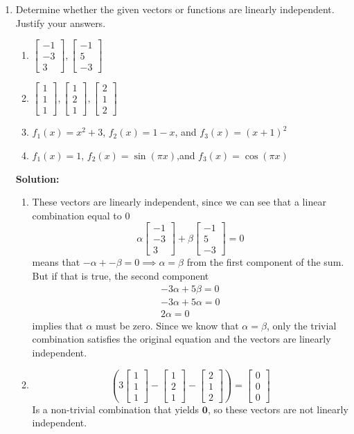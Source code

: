 \documentclass[]{article}
\newcommand{\bbm}{\begin{bmatrix}}		%
\newcommand{\ebm}{\end{bmatrix}}		%
\newcommand{\solution}{\vskip 0.5cm \textbf{\large Solution:} \\}
\begin{document}
    \begin{enumerate}[resume]
	\item Determine whether the given vectors or functions are linearly independent. Justify your answers.
	  \begin{enumerate}
	  \item $\bbm -1\\-3\\3 \ebm, \bbm -1\\5\\-3 \ebm$
	  \item $\bbm 1\\1\\1 \ebm, \bbm 1\\2\\1 \ebm, \bbm 2\\1\\2 \ebm$
	  \item $f_1(x)=x^2+3$, $f_2(x) = 1-x$, and $f_3(x) = (x+1)^2$
	  \item $f_1(x)=1$, $f_2(x)=\sin(\pi x)$,and $f_3(x)=\cos(\pi x)$

	  \end{enumerate}

	  \solution
	  \begin{enumerate}
	  \item These vectors are linearly independent, since we can see
        that a linear combination equal to 0
        \[
        \alpha \bbm -1\\-3\\3 \ebm +  \beta \bbm -1\\5\\-3 \ebm = 0
        \]
        means that $-\alpha + -\beta = 0 \implies \alpha = \beta$ from
        the first component of the sum. But if that is true, the second
        component
        \begin{gather*}
          -3\alpha + 5\beta = 0 \\
          -3\alpha + 5\alpha = 0 \\
          2\alpha = 0
        \end{gather*}
        implies that $\alpha$ must be zero. Since we know that $\alpha =
        \beta$, only the trivial combination satisfies the original
        equation and the vectors are linearly independent.

        
	  \item
        \[
        \left(3\bbm 1\\1\\1 \ebm - \bbm 1\\2\\1 \ebm - \bbm 2\\1\\2
        \ebm\right) = \bbm 0\\0\\0 \ebm
        \]
        Is a non-trivial combination that yields $\bm{0}$, so these vectors are not linearly
        independent.


\end{enumerate}
\end{enumerate}
\end{document}
